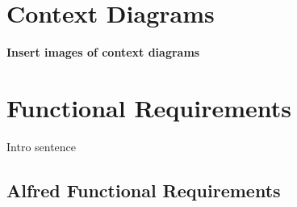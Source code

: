 \documentclass [11pt]{article}
\begin{document}


\section{Context Diagrams}
\textbf{Insert images of context diagrams}



\section {Functional Requirements} 
Intro sentence






\subsection{Alfred Functional Requirements}
\end{document}
